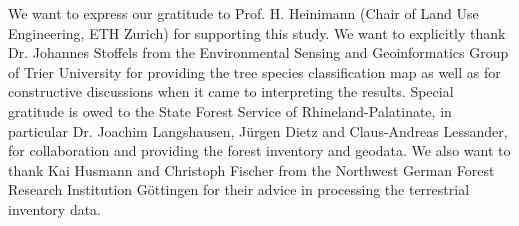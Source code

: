 We want to express our gratitude to Prof. H. Heinimann (Chair of Land Use Engineering, ETH Zurich) for supporting this study. We want to explicitly thank Dr. Johannes Stoffels from the Environmental Sensing and Geoinformatics Group of Trier University for providing the tree species classification map as well as for constructive discussions when it came to interpreting the results. Special gratitude is owed to the State Forest Service of Rhineland-Palatinate, in particular Dr. Joachim Langshausen, J{\"u}rgen Dietz and Claus-Andreas Lessander, for collaboration and providing the forest inventory and geodata. We also want to thank Kai Husmann and Christoph Fischer from the Northwest German Forest Research Institution G{\"o}ttingen for their advice in processing the terrestrial inventory data.

